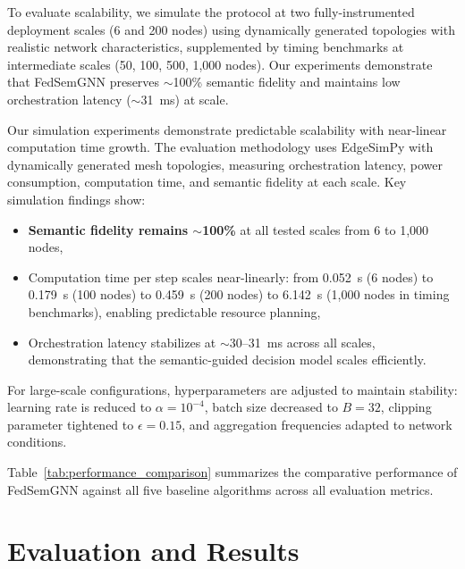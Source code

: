 \documentclass[conference]{IEEEtran}
\begin{document}
	\textcolor{revblue}{To evaluate scalability, we simulate the protocol at two fully-instrumented deployment scales (6 and 200 nodes) using dynamically generated topologies with realistic network characteristics, supplemented by timing benchmarks at intermediate scales (50, 100, 500, 1{,}000 nodes). Our experiments demonstrate that FedSemGNN preserves $\sim$100\% semantic fidelity and maintains low orchestration latency ($\sim$31~ms) at scale.}
	
	\textcolor{revblue}{Our simulation experiments demonstrate predictable scalability with near-linear computation time growth. The evaluation methodology uses EdgeSimPy with dynamically generated mesh topologies, measuring orchestration latency, power consumption, computation time, and semantic fidelity at each scale. Key simulation findings show:}
	\begin{itemize}
		\item \textcolor{revblue}{\textbf{Semantic fidelity remains ${\sim}$100\%} at all tested scales from 6 to 1{,}000 nodes,}
		\item \textcolor{revblue}{Computation time per step scales near-linearly: from 0.052~s (6 nodes) to 0.179~s (100 nodes) to 0.459~s (200 nodes) to 6.142~s (1{,}000 nodes in timing benchmarks), enabling predictable resource planning,}
		\item \textcolor{revblue}{Orchestration latency stabilizes at ${\sim}$30--31~ms across all scales, demonstrating that the semantic-guided decision model scales efficiently.}
	\end{itemize}
	
	For large-scale configurations, hyperparameters are adjusted to maintain stability: learning rate is reduced to $\alpha = 10^{-4}$, batch size decreased to $B = 32$, clipping parameter tightened to $\epsilon = 0.15$, and aggregation frequencies adapted to network conditions.
	
	\textcolor{revblue}{Table~\ref{tab:performance_comparison} summarizes the comparative performance of FedSemGNN against all five baseline algorithms across all evaluation metrics.}
	
	
	\section{Evaluation and Results}
	\label{sec:evaluation}
	
\end{document}
